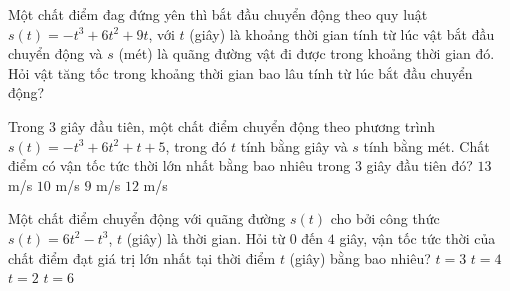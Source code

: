 \begin{bt}%
	Một chất điểm đag đứng yên thì bắt đầu chuyển động theo quy luật $s(t)=-t^3+6t^2+9t$, với $t$ (giây) là khoảng thời gian tính từ lúc vật bắt đầu chuyển động và $s$ (mét) là quãng đường vật đi được trong khoảng thời gian đó. Hỏi vật tăng tốc trong khoảng thời gian bao lâu tính từ lúc bắt đầu chuyển động?
\end{bt}

\begin{ex}%
	Trong $3$ giây đầu tiên, một chất điểm chuyển động theo phương trình\break $s(t)=-t^3+6t^2+t+5$, trong đó $t$ tính bằng giây và $s$ tính bằng mét. Chất điểm có vận tốc  tức thời lớn nhất bằng bao nhiêu trong $3$ giây đầu tiên đó?
	\choice 
		 {$13$ m/s}
		 {$10$ m/s}
		 {$9$ m/s}
		 {\True $12$ m/s}
\end{ex}

\begin{ex}%
	Một chất điểm chuyển động với quãng đường $s(t)$ cho bởi công thức \break $s(t)=6 t^{2}-t^{3}$, $t$ (giây) là thời gian. Hỏi từ $0$ đến $4$ giây, vận tốc tức thời của chất điểm  đạt giá trị lớn nhất tại thời điểm $t$ (giây) bằng bao nhiêu?
	 \choice
		 {$t=3$}
		 {$t=4$}
		{\True  $t=2$}
		{$t=6$} 
\end{ex}

